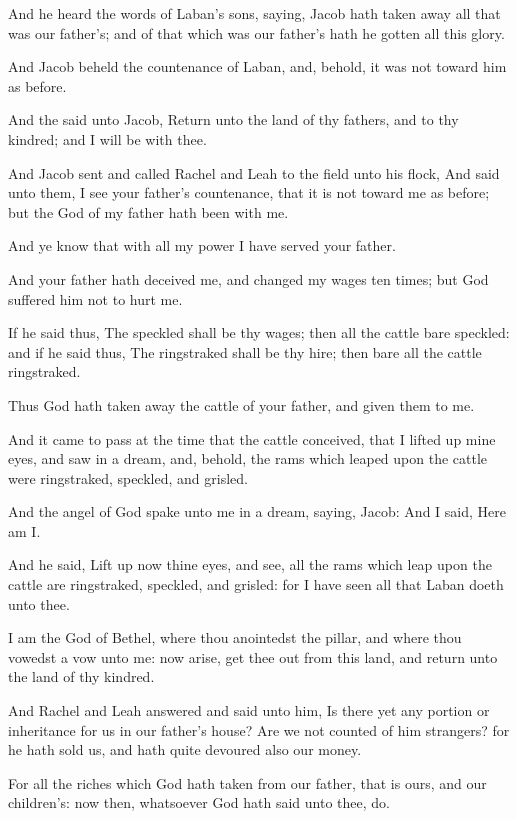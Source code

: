 \verse And he heard the words of Laban's sons, saying, Jacob hath taken away all that was our father's; and of that which was our father's hath he gotten all this glory.

\verse And Jacob beheld the countenance of Laban, and, behold, it was not toward him as before.

\verse And the \LORD said unto Jacob, Return unto the land of thy fathers, and to thy kindred; and I will be with thee.

\verse And Jacob sent and called Rachel and Leah to the field unto his flock, \verse And said unto them, I see your father's countenance, that it is not toward me as before; but the God of my father hath been with me.

\verse And ye know that with all my power I have served your father.

\verse And your father hath deceived me, and changed my wages ten times; but God suffered him not to hurt me.

\verse If he said thus, The speckled shall be thy wages; then all the cattle bare speckled: and if he said thus, The ringstraked shall be thy hire; then bare all the cattle ringstraked.

\verse Thus God hath taken away the cattle of your father, and given them to me.

\verse And it came to pass at the time that the cattle conceived, that I lifted up mine eyes, and saw in a dream, and, behold, the rams which leaped upon the cattle were ringstraked, speckled, and grisled.

\verse And the angel of God spake unto me in a dream, saying, Jacob: And I said, Here am I.

\verse And he said, Lift up now thine eyes, and see, all the rams which leap upon the cattle are ringstraked, speckled, and grisled: for I have seen all that Laban doeth unto thee.

\verse I am the God of Bethel, where thou anointedst the pillar, and where thou vowedst a vow unto me: now arise, get thee out from this land, and return unto the land of thy kindred.

\verse And Rachel and Leah answered and said unto him, Is there yet any portion or inheritance for us in our father's house?  \verse Are we not counted of him strangers? for he hath sold us, and hath quite devoured also our money.

\verse For all the riches which God hath taken from our father, that is ours, and our children's: now then, whatsoever God hath said unto thee, do.

